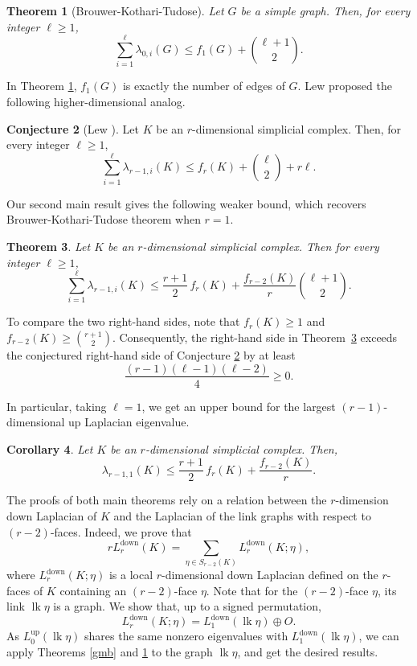 \documentclass[12pt]{amsart}
\theoremstyle{plain}
\newtheorem{thm}{Theorem}[section]
\newtheorem{coro}[thm]{Corollary}
\theoremstyle{definition}
\newtheorem{conj}[thm]{Conjecture}
\numberwithin{equation}{section}
\numberwithin{figure}{section}
\newcommand{\Ldown}{L^{\operatorname{down}}}
\newcommand{\Lup}{L^{\operatorname{up}}}
\newcommand{\lk}{\operatorname{lk}}
\begin{document}
\begin{thm}[Brouwer-Kothari-Tudose\cite{BH2012, KT2026}]
\label{brou}
Let $G$ be a simple graph.
Then, for every integer $\ell\geq 1$,
\[
\sum_{i = 1}^{\ell}\lambda_{0,i}(G)
\leq
f_1(G) + \binom{\ell + 1}{2}.
\]
\end{thm}

In Theorem \ref{brou}, $f_1(G)$ is exactly the number of edges of $G$. Lew proposed the following higher-dimensional analog.

\begin{conj}[Lew \cite{L2025}]\label{lew}
Let $K$ be an $r$-dimensional simplicial complex.
Then, for every integer $\ell \geq 1$,
\[
 \sum_{i = 1}^{\ell}\lambda_{r-1,i}(K)
\leq f_r(K) + \binom{\ell}{2} + r\ell.
\]
\end{conj}

Our second main result gives the following weaker bound, which recovers Brouwer-Kothari-Tudose theorem when $r=1$.

\begin{thm}\label{main-b}
Let $K$ be an $r$-dimensional simplicial complex.
Then for every integer $\ell \geq 1$,
\[
\sum_{i = 1}^{\ell}\lambda_{r-1,i}(K)
\leq
\frac{r+1}{2}\,f_r(K)
+
\frac{f_{r-2}(K)}{r}
\binom{\ell+1}{2}.
\]
\end{thm}

To compare the two right-hand sides, note that $f_r(K)\geq 1$ and $f_{r-2}(K)\geq\binom{r+1}{2}$.
Consequently, the right-hand side in Theorem~\ref{main-b} exceeds the conjectured right-hand side of Conjecture \ref{lew} by at least
\[
\frac{(r-1)(\ell-1)(\ell-2)}{4}\geq 0.
\]


In particular, taking $\ell=1$, we get an upper bound for the largest $(r-1)$-dimensional up Laplacian eigenvalue.

\begin{coro}
Let $K$ be an $r$-dimensional simplicial complex.
Then,
\[
\lambda_{r-1,1}(K)
\leq
\frac{r+1}{2}\,f_r(K) + \frac{f_{r-2}(K)}{r}.
\]
\end{coro}

The proofs of both main theorems rely on a relation between 
the $r$-dimension down Laplacian of $K$ and the Laplacian of the link graphs with respect to $(r-2)$-faces.
Indeed, we prove that
$$ r\Ldown_r(K)=\sum_{\eta \in S_{r-2}(K)} \Ldown_r(K;\eta),$$
where $ \Ldown_r(K;\eta)$ is a local $r$-dimensional down Laplacian defined on the $r$-faces of $K$ containing an $(r-2)$-face $\eta$.
Note that for the $(r-2)$-face $\eta$, its link $\lk \eta$ is a graph.
We show that, up to a signed permutation,
 $$ \Ldown_r(K;\eta)=\Ldown_1(\lk \eta) \oplus O.$$
As  $\Lup_0(\lk \eta)$ shares the same nonzero eigenvalues with $\Ldown_1(\lk \eta)$, we can apply Theorems \ref{gmb} and \ref{brou} to the graph $\lk \eta$, and get the desired results.
\end{document}
